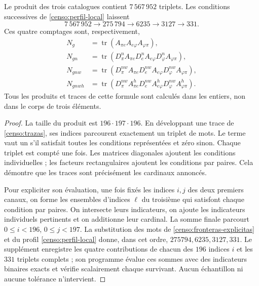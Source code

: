 \begin{theorem}
\label{censo:teorema-conteo}
Le produit des trois catalogues contient \(7\,567\,952\) triplets.
Les conditions successives de \eqref{censo:perfil-local} laissent
\begin{equation}
 7\,567\,952\longrightarrow275\,794\longrightarrow6235
 \longrightarrow3127\longrightarrow331.
 \label{censo:cadena-local}
\end{equation}
Ces quatre comptages sont, respectivement,
\begin{align}
 N_g&=\operatorname{tr}(A_{\pi e}A_{e\varphi}A_{\varphi\pi}),
 \nonumber\\
 N_{gn}&=\operatorname{tr}(D_\pi^n A_{\pi e}
             D_e^n A_{e\varphi}D_\varphi^n A_{\varphi\pi}),
 \nonumber\\
 N_{gnw}&=\operatorname{tr}(D_\pi^{nw} A_{\pi e}
             D_e^{nw} A_{e\varphi}D_\varphi^{nw} A_{\varphi\pi}),
 \nonumber\\
 N_{gnwh}&=\operatorname{tr}(D_\pi^{nw} A^h_{\pi e}
             D_e^{nw} A^h_{e\varphi}D_\varphi^{nw} A^h_{\varphi\pi}).
 \label{censo:trazas}
\end{align}
Tous les produits et traces de cette formule sont calculés dans les entiers,  
non dans le corps de trois éléments.
\end{theorem}
\begin{proof}
La taille du produit est \(196\cdot197\cdot196\). En développant
une trace de \eqref{censo:trazas}, ses indices parcourent exactement un
triplet de mots. Le terme vaut un s'il satisfait toutes les conditions
représentées et zéro sinon. Chaque triplet est compté une fois.
Les matrices diagonales ajoutent les conditions individuelles ; les facteurs
rectangulaires ajoutent les conditions par paires. Cela démontre que les
traces sont précisément les cardinaux annoncés.

Pour expliciter son évaluation, une fois fixés les indices \(i,j\) des deux premiers canaux, on forme les ensembles d'indices \(\ell\) du troisième qui satisfont chaque condition par paires. On intersecte leurs indicateurs, on ajoute les indicateurs individuels pertinents et on additionne leur cardinal. La somme finale parcourt \(0\leq i<196\), \(0\leq j<197\). La substitution des mots de \eqref{censo:fronteras-explicitas} et du profil \eqref{censo:perfil-local} donne, dans cet ordre, \(275794,6235,3127,331\). Le supplément enregistre les quatre contributions de chacun des \(196\) indices \(i\) et les \(331\) triplets complets ; son programme évalue ces sommes avec des indicateurs binaires exacts et vérifie scalairement chaque survivant. Aucun échantillon ni aucune tolérance n'intervient.
\end{proof}


